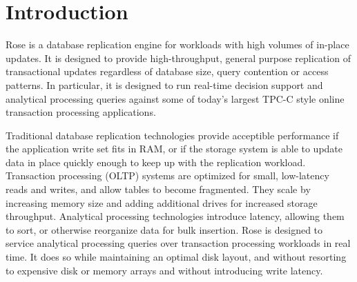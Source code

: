 \documentclass{vldb}
\newcommand{\rows}{Rose\xspace}
\newcommand{\rowss}{Rose's\xspace}
\begin{document}
\begin{abstract}
\rowss throughput is limited by sequential I/O bandwidth.  We use
compression to reduce this bottleneck.  Rather than reassemble
rows from a column-oriented disk layout, we adapt existing column
compression algorithms to a simple row-oriented data layout.  This
approach to database compression introduces negligible space overhead
and can be applied to most single-pass, randomly accessible
compression formats.  Our prototype uses lightweight (superscalar)
column compression algorithms.

Existing analytical models and our hybrid of the TPC-C and TPC-H
benchmarks reveal that, for applications with write sets larger than
RAM, \rows provides orders of magnitude greater throughput than
conventional replication techniques.

\end{abstract}





\section{Introduction}

\rows is a database replication engine for workloads with high volumes
of in-place updates.  It is designed to provide high-throughput,
general purpose replication of transactional updates regardless of
database size, query contention or access patterns.  In particular, it
is designed to run real-time decision support and analytical
processing queries against some of today's largest TPC-C style online
transaction processing applications.

Traditional database replication technologies provide acceptible
performance if the application write set fits in RAM, or if the
storage system is able to update data in place quickly enough to keep
up with the replication workload.  Transaction processing (OLTP)
systems are optimized for small, low-latency reads and writes, and allow tables to become fragmented.  They scale by
increasing memory size and adding additional drives for increased
storage throughput.  Analytical processing technologies introduce
latency, allowing them to sort, or otherwise reorganize data for bulk
insertion.  \rows is designed to service analytical processing queries
over transaction processing workloads in real time.  It does so
while maintaining an optimal disk layout, and without resorting to
expensive disk or memory arrays and without introducing write latency.
\end{document}
